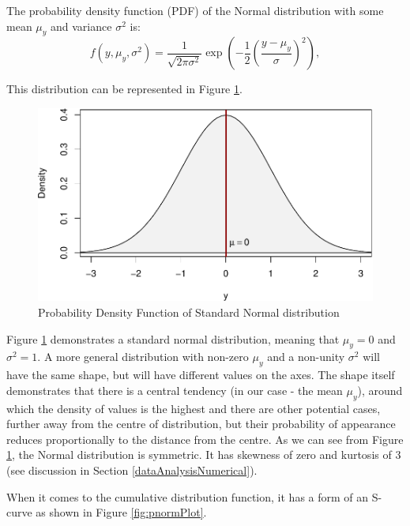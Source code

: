 \documentclass[
]{book}
\theoremstyle{definition}
\theoremstyle{definition}
\theoremstyle{definition}
\theoremstyle{definition}
\theoremstyle{remark}
\begin{document}
The probability density function (PDF) of the Normal distribution with some mean \(\mu_y\) and variance \(\sigma^2\) is:
\begin{equation}
    f(y, \mu_y, \sigma^2) = \frac{1}{\sqrt{2 \pi \sigma^2}} \exp \left( -\frac{1}{2} \left(\frac{y - \mu_y}{\sigma}\right)^2 \right) ,
    \label{eq:Normal}
\end{equation}

This distribution can be represented in Figure \ref{fig:dnormPlot}.

\begin{figure}
\centering
\includegraphics{Svetunkov---Statistics-for-Business-Analytics_files/figure-latex/dnormPlot-1.pdf}
\caption{\label{fig:dnormPlot}Probability Density Function of Standard Normal distribution}
\end{figure}

Figure \ref{fig:dnormPlot} demonstrates a standard normal distribution, meaning that \(\mu_y=0\) and \(\sigma^2=1\). A more general distribution with non-zero \(\mu_y\) and a non-unity \(\sigma^2\) will have the same shape, but will have different values on the axes. The shape itself demonstrates that there is a central tendency (in our case - the mean \(\mu_y\)), around which the density of values is the highest and there are other potential cases, further away from the centre of distribution, but their probability of appearance reduces proportionally to the distance from the centre. As we can see from Figure \ref{fig:dnormPlot}, the Normal distribution is symmetric. It has skewness of zero and kurtosis of 3 (see discussion in Section \ref{dataAnalysisNumerical}).

When it comes to the cumulative distribution function, it has a form of an S-curve as shown in Figure \ref{fig:pnormPlot}.
\end{document}
